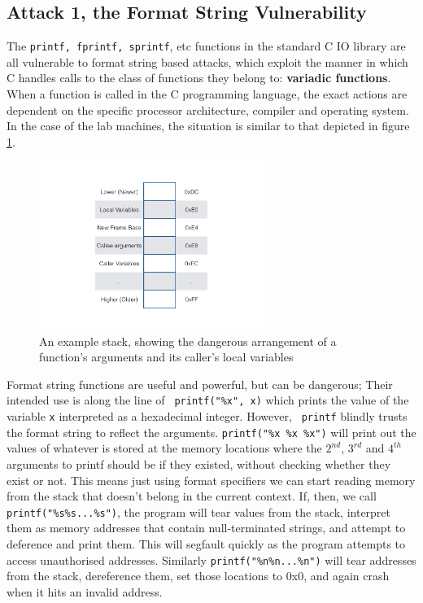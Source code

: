 \subsection{Attack 1, the Format String Vulnerability}

The {\tt printf, fprintf, sprintf}, etc functions in the standard C IO library are all vulnerable to format string based
attacks, which exploit the manner in which C handles calls to the class of functions they belong to: \textbf{variadic
functions}\cite{vfunc}. When a function is called in the C programming language,\cite{call_conv} the exact actions are
dependent on the specific processor architecture, compiler and operating system. In the case of the lab machines, the
situation is similar to that depicted in figure \ref{fig_stack}.

\begin{figure}[ht] \centering \includegraphics[width = 0.65\textwidth]{./images/stack.jpg} \caption{An example stack,
showing the dangerous arrangement of a function's arguments and its caller's local variables} \label{fig_stack}
\end{figure}

Format string functions are useful and powerful, but can be dangerous; Their intended use is along the line of {\tt
printf("\%x", x)} which prints the value of the variable {\tt x} interpreted as a hexadecimal integer. However, {\tt
printf} blindly trusts the format string to reflect the arguments. {\tt printf("\%x \%x \%x")} will print out the values
of whatever is stored at the memory locations where the $2^{nd}$, $3^{rd}$ and $4^{th}$ arguments to printf should be if
they existed, without checking whether they exist or not. This means just using format specifiers we can start reading
memory from the stack that doesn't belong in the current context. If, then, we call {\tt printf("\%s\%s...\%s")}, the
program will tear values from the stack, interpret them as memory addresses that contain null-terminated strings, and
attempt to deference and print them. This will segfault quickly as the program attempts to access unauthorised
addresses. Similarly {\tt printf("\%n\%n...\%n")} will tear addresses from the stack, dereference them, set those
locations to 0x0, and again crash when it hits an invalid address.

